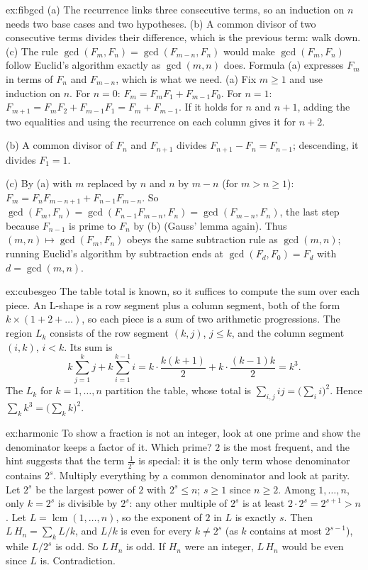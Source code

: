\begin{solution}{ex:fibgcd}
\idea (a) The recurrence links three consecutive terms, so an induction on $n$ needs two base cases and two hypotheses. (b) A common divisor of two consecutive terms divides their difference, which is the previous term: walk down. (c) The rule $\gcd(F_m,F_n)=\gcd(F_{m-n},F_n)$ would make $\gcd(F_m,F_n)$ follow Euclid's algorithm exactly as $\gcd(m,n)$ does. Formula (a) expresses $F_m$ in terms of $F_n$ and $F_{m-n}$, which is what we need.
\writeup (a) Fix $m\ge1$ and use induction on $n$. For $n=0$: $F_m=F_mF_1+F_{m-1}F_0$.
For $n=1$: $F_{m+1}=F_mF_2+F_{m-1}F_1=F_m+F_{m-1}$. If it holds for $n$ and $n+1$, adding the two
equalities and using the recurrence on each column gives it for $n+2$.

(b) A common divisor of $F_n$ and $F_{n+1}$ divides $F_{n+1}-F_n=F_{n-1}$; descending, it divides $F_1=1$.

(c) By (a) with $m$ replaced by $n$ and $n$ by $m-n$ (for $m>n\ge1$): $F_m=F_nF_{m-n+1}+F_{n-1}F_{m-n}$.
So $\gcd(F_m,F_n)=\gcd(F_{n-1}F_{m-n},F_n)=\gcd(F_{m-n},F_n)$, the last step because $F_{n-1}$ is prime to $F_n$ by (b) (Gauss' lemma again).
Thus $(m,n)\mapsto\gcd(F_m,F_n)$ obeys the same subtraction rule as $\gcd(m,n)$; running Euclid's
algorithm by subtraction ends at $\gcd(F_d,F_0)=F_d$ with $d=\gcd(m,n)$.
\end{solution}

\begin{solution}{ex:cubesgeo}
\idea The table total is known, so it suffices to compute the sum over each piece. An L-shape is a row segment plus a column segment, both of the form $k\times(1+2+\dots)$, so each piece is a sum of two arithmetic progressions.
\writeup The region $L_k$ consists of the row segment $(k,j)$, $j\le k$, and the column segment $(i,k)$, $i<k$. Its sum is
\[
k\sum_{j=1}^kj+k\sum_{i=1}^{k-1}i=k\cdot\frac{k(k+1)}2+k\cdot\frac{(k-1)k}2=k^3.
\]
The $L_k$ for $k=1,\dots,n$ partition the table, whose total is $\sum_{i,j}ij=\bigl(\sum_i i\bigr)^2$. Hence
$\sum_k k^3=\bigl(\sum_k k\bigr)^2$.
\end{solution}

\begin{solution}{ex:harmonic}
\idea To show a fraction is not an integer, look at one prime and show the denominator keeps a factor of it. Which prime? $2$ is the most frequent, and the hint suggests that the term $\frac1{2^s}$ is special: it is the only term whose denominator contains $2^s$. Multiply everything by a common denominator and look at parity.
\writeup Let $2^s$ be the largest power of $2$ with $2^s\le n$; $s\ge1$ since $n\ge2$. Among $1,\dots,n$, only $k=2^s$
is divisible by $2^s$: any other multiple of $2^s$ is at least $2\cdot2^s=2^{s+1}>n$. Let $L=\operatorname{lcm}(1,\dots,n)$,
so the exponent of $2$ in $L$ is exactly $s$. Then $L\,H_n=\sum_k L/k$, and $L/k$ is even for every $k\ne2^s$ (as $k$ contains at most $2^{s-1}$), while $L/2^s$ is odd.
So $L\,H_n$ is odd. If $H_n$ were an integer, $L\,H_n$ would be even since $L$ is. Contradiction.
\end{solution}

